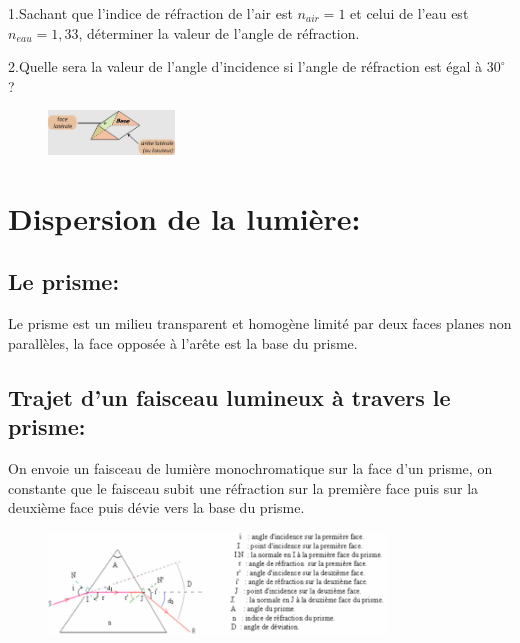 \documentclass[12pt]{article}
\begin{document}
1.Sachant que l'indice de réfraction de l'air est $n_{air}=1$ et celui de l'eau est $n_{eau}=1,33$, déterminer la valeur de l'angle de réfraction.

2.Quelle sera la valeur de l'angle d'incidence si l'angle de réfraction est égal à $30^{\circ}$?

\begin{figure}
	\vspace{-2.8cm}
	\includegraphics[width=0.3\textwidth]{./img/OLprisme.png}
\end{figure}


\section{Dispersion de la lumière: }
\subsection{Le prisme:}
Le prisme est un milieu transparent et homogène limité par deux faces planes non parallèles, la face opposée à l’arête est la base du
prisme.

\subsection{Trajet d'un faisceau lumineux à travers le prisme:}
On envoie un faisceau de lumière monochromatique sur la face d'un prisme, on constante que le faisceau subit une réfraction sur la
première face puis sur la deuxième face puis dévie vers la base du prisme.
\begin{figure}[h]
	\begin{center}

	\vspace{-0.5cm}
		\includegraphics[width=0.8\textwidth]{./img/OLprismeCalc.png}
	\end{center}
	\vspace{-1.2cm}
\end{figure}
\end{document}
